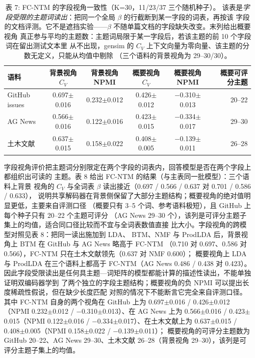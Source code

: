 \documentclass{article}
\begin{document}
\begin{table}[t]
\centering
\caption{表 7: FC-NTM 的字段视角一致性（K=30，11/23/37 三个随机种子）。
该表是\emph{字段受限的主题词读出}：把同一个全局 $\beta$ 的行截断到某一字段的词表，再按该
字段的文档评测。它不是遮挡实验——$\beta$ 不随单篇文档的字段缺失改变。末列给出概要视角
真正参与平均的主题数：主题词局限于某一字段后，若该主题的前 10 个字段词在留出测试文本里
从不出现，gensim 的 $C_V$ 上下文向量为零向量、该主题的分数无定义，只能从均值中剔除
（三个语料的背景视角为 29--30/30）。}
\label{tab:fieldview}
\small
\begin{tabular}{lcccc r}
\toprule
语料 & 背景视角 $C_V$ & 背景视角 NPMI & 概要视角 $C_V$ & 概要视角 NPMI & 概要可评分主题 \\
\midrule
GitHub issues & 0.697$\pm$0.016 & 0.232$\pm$0.012 & 0.426$\pm$0.012 & $-$0.310$\pm$0.013 & 20--22 \\
AG News & 0.566$\pm$0.016 & 0.122$\pm$0.016 & 0.423$\pm$0.015 & $-$0.334$\pm$0.017 & 29--30 \\
土木文献 & 0.637$\pm$0.015 & 0.158$\pm$0.022 & 0.408$\pm$0.005 & $-$0.139$\pm$0.011 & 26--28 \\
\bottomrule
\end{tabular}
\end{table}

字段视角评价把主题词分别限定在两个字段的词表内，回答模型是否在两个字段上都组织出可读的
主题。表 8 给出 FC-NTM 的结果（与主表同一批模型）：三个语料上背景
视角的 $C_V$ 与全词表 $\beta$ 读出接近（0.697 / 0.566 / 0.637 对 0.701 / 0.586 / 0.633），
说明共享解码器在背景侧保留了大部分主题结构；概要视角的绝对值明显更低，主要来自评测口径
（概要只有 3--5 个词、参考语料极短），且 GitHub 上每个种子只有 20--22 个主题可评分
（AG News 29--30 个），该列是可评分主题子集上的均值，适合同口径比较而不宜与全词表数值直接
比大小。字段视角的跨模型对照见表 8：把同一读出施加到 LDA、
BTM、NMF 与 ProdLDA 后，背景视角上 BTM 在 GitHub 与 AG News 略高于 FC-NTM
（0.710 对 0.697、0.586 对 0.566），FC-NTM 只在土木文献领先（0.637 对 NMF 0.600）；
概要视角上 LDA 与 ProdLDA 在三个语料上都高于 FC-NTM（AG News 0.486 / 0.438 对 0.423）。
因此字段受限读出是任何具主题—词矩阵的模型都能计算的描述性读出，不能单独证明双编码器学到
了两个独立的字段主题结构；概要视角的负 NPMI 可以提出长度稀疏性假说，但在缺少长度匹配
对照的情况下不能断言它完全来自评测口径。
其中 FC-NTM 自身的两个视角在 GitHub 上为 0.697$\pm$0.016 / 0.426$\pm$0.012
（NPMI 0.232$\pm$0.012 / $-$0.310$\pm$0.013）、在 AG News 上为 0.566$\pm$0.016 /
0.423$\pm$0.015（NPMI 0.122$\pm$0.016 / $-$0.334$\pm$0.017）、在土木文献上为
0.637$\pm$0.015 / 0.408$\pm$0.005（NPMI 0.158$\pm$0.022 / $-$0.139$\pm$0.011）；
概要视角的可评分主题数为 GitHub 20--22、AG News 29--30、土木文献 26--28（背景视角
29--30），该列是可评分主题子集上的均值。
\end{document}
